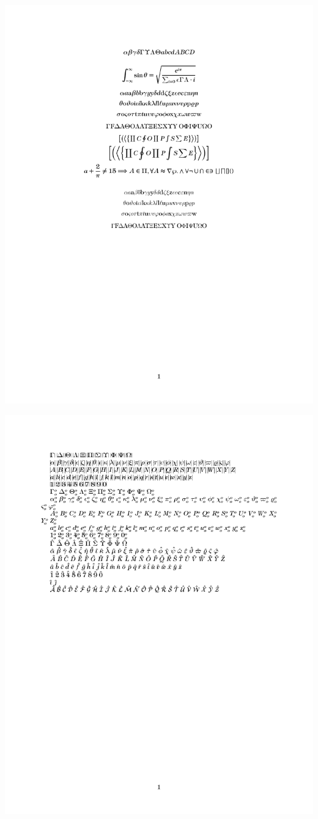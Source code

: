 \documentclass[twocolumn]{article}
\begin{document}
 \noindent\includegraphics*{../results/tiffany-font}\par
{} \noindent\includegraphics*{../results/tiffany-pos}\par
\end{document}
